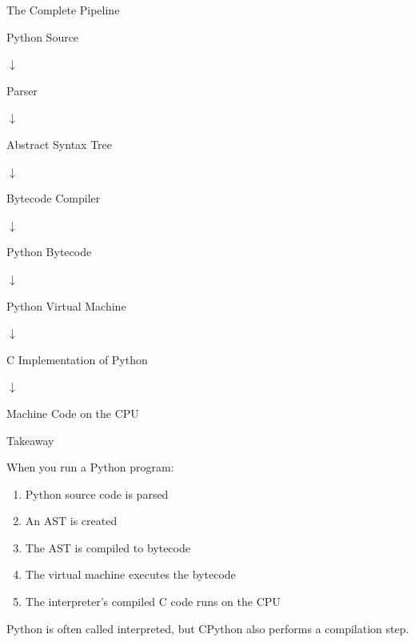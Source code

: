 \documentclass{beamer}
\begin{document}
\begin{frame}{The Complete Pipeline}

\begin{center}
Python Source

$\downarrow$

Parser

$\downarrow$

Abstract Syntax Tree

$\downarrow$

Bytecode Compiler

$\downarrow$

Python Bytecode

$\downarrow$

Python Virtual Machine

$\downarrow$

C Implementation of Python

$\downarrow$

Machine Code on the CPU
\end{center}

\end{frame}

\begin{frame}{Takeaway}

When you run a Python program:

\begin{enumerate}
\item Python source code is parsed
\item An AST is created
\item The AST is compiled to bytecode
\item The virtual machine executes the bytecode
\item The interpreter's compiled C code runs on the CPU
\end{enumerate}

\vspace{0.4cm}

Python is often called interpreted, but CPython
also performs a compilation step.

\end{frame}
\end{document}
